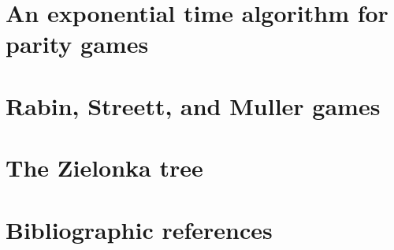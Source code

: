 
\section{An exponential time algorithm for parity games}
\label{2-sec:parity}



\section{Rabin, Streett, and Muller games}
\label{2-sec:muller}



\section{The Zielonka tree}
\label{2-sec:zielonka}



\section*{Bibliographic references}
\label{2-sec:references}




